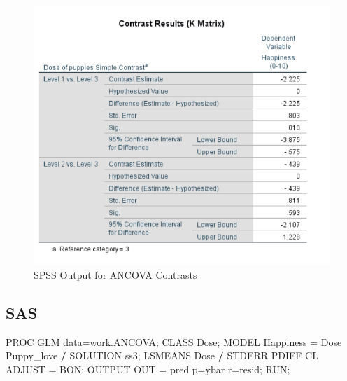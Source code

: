 \documentclass[
]{book}
\newenvironment{Shaded}{\begin{snugshade}}{\end{snugshade}}
\newcommand{\NormalTok}[1]{#1}
\newcommand{\OperatorTok}[1]{\textcolor[rgb]{0.81,0.36,0.00}{\textbf{#1}}}
\newcommand{\StringTok}[1]{\textcolor[rgb]{0.31,0.60,0.02}{#1}}
\begin{document}
\begin{figure}[!h]
\includegraphics{Screenshots/ANCOVA/contrastsSPSS} \caption{\label{fig:ancovaSPSS2}SPSS Output for ANCOVA Contrasts}\label{fig:ancovaSPSS2}
\end{figure}

\hypertarget{sas-5}{%
\subsection{SAS}\label{sas-5}}

\begin{Shaded}
\begin{Highlighting}[]
\NormalTok{PROC GLM data=work.ANCOVA;}
\NormalTok{CLASS Dose;}
\NormalTok{MODEL Happiness =}\StringTok{ }\NormalTok{Dose Puppy_love }\OperatorTok{/}\StringTok{ }\NormalTok{SOLUTION ss3;}
\NormalTok{LSMEANS Dose }\OperatorTok{/}\StringTok{ }\NormalTok{STDERR PDIFF CL ADJUST =}\StringTok{ }\NormalTok{BON;}
\NormalTok{OUTPUT OUT =}\StringTok{ }\NormalTok{pred p=ybar r=resid;}
\NormalTok{RUN;}
\end{Highlighting}
\end{Shaded}
\end{document}
